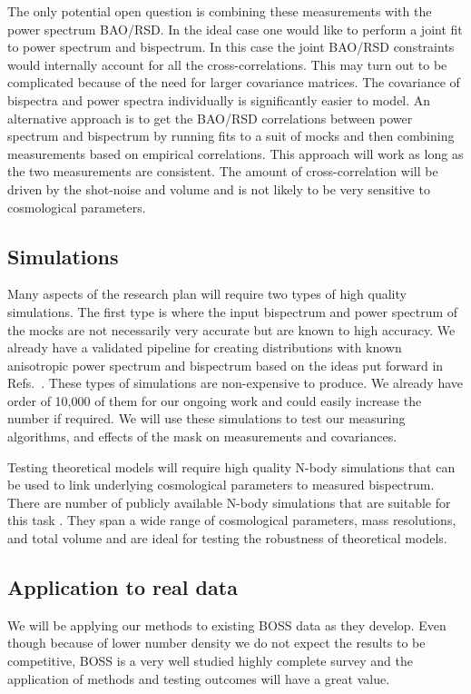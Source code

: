 The only potential open question is combining these measurements with the power
spectrum BAO/RSD. In the ideal case one would like to perform a joint fit to
power spectrum and bispectrum. In this case the joint BAO/RSD constraints would
internally account for all the cross-correlations. This may turn out to be
complicated because of the need for larger covariance matrices. The covariance
of bispectra and power spectra individually is significantly easier to model.
An alternative approach is to get the BAO/RSD correlations between power
spectrum and bispectrum by running fits to a suit of mocks and then combining
measurements based on empirical correlations. This approach will work as long
as the two measurements are consistent. The amount of cross-correlation will
be driven by the shot-noise and volume and is not likely to be very sensitive
to cosmological parameters.

\subsection*{Simulations}

Many aspects of the research plan will require two types of high quality
simulations. The first type is where the input bispectrum and power spectrum of
the mocks are not necessarily very accurate but are known to high accuracy. We
already have a validated pipeline for creating distributions with known
anisotropic power spectrum and bispectrum based on the ideas put forward in
Refs.~\cite{}. These types of simulations are non-expensive to produce. We
already have order of 10,000 of them for our ongoing work and could easily
increase the number if required. We will use these simulations to test our
measuring algorithms, and effects of the mask on measurements and covariances. 

Testing theoretical models will require high quality N-body simulations that
can be used to link underlying cosmological parameters to measured bispectrum.
There are number of publicly available N-body simulations that are suitable for
this task \cite{}. They span a wide range of cosmological parameters, mass
resolutions, and total volume and are ideal for testing the robustness of
theoretical models.  

\subsection*{Application to real data}

We will be applying our methods to existing BOSS data as they develop. Even
though because of lower number density we do not expect the results to be
competitive, BOSS is a very well studied highly complete survey and the
application of methods and testing outcomes will have a great value. 

